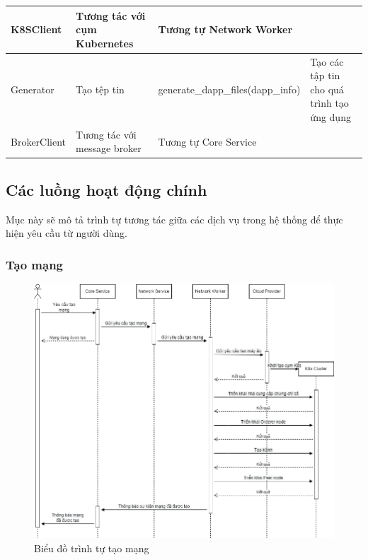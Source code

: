 \documentclass[../DoAn.tex]{subfiles}
\begin{document}
\begin{longtable}{|p{}|p{}|p{}|p{}|}
    K8SClient                                   & Tương tác với cụm Kubernetes                                   & \multicolumn{2}{p{0.6\textwidth}|}{Tương tự Network Worker}                                                                              \\ \hline
    Generator                                   & Tạo tệp tin                                                    & generate\_dapp\_files\hspace{0pt}(dapp\_info)               & Tạo các tập tin cho quá trình tạo ứng dụng                                 \\ \hline
    BrokerClient                                & Tương tác với message broker                                   & \multicolumn{2}{p{0.6\textwidth}|}{Tương tự Core Service}                                                                               \\ \hline
\end{longtable}

\subsection{Các luồng hoạt động chính}

Mục này sẽ mô tả trình tự tương tác giữa các dịch vụ trong hệ thống để thực hiện
yêu cầu từ người dùng.

\subsubsection{Tạo mạng}

\begin{figure}[H]
    \centering
    \includegraphics[width=0.75\linewidth]{Hinhve/DoAn-SeqCreateNetwork.drawio.png}
    \caption{Biểu đồ trình tự tạo mạng}
    \label{fig:seqCreateNetwork}
\end{figure}
\end{document}
